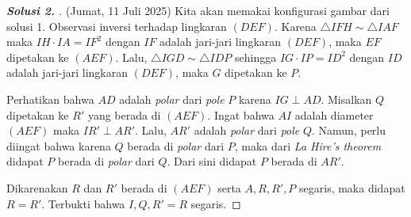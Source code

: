 \begin{proof}[\textbf{Solusi 2. }] (Jumat, 11 Juli 2025) 
    Kita akan memakai konfigurasi gambar dari solusi 1. Observasi inversi terhadap lingkaran $(DEF)$. 
    Karena $\triangle IFH \sim \triangle IAF$ maka $IH \cdot IA = IF^2$ dengan $IF$ adalah jari-jari lingkaran $(DEF)$, maka $EF$ dipetakan ke $(AEF)$.
    Lalu, $\triangle IGD \sim \triangle IDP$ sehingga $IG \cdot IP = ID^2$ dengan $ID$ adalah jari-jari lingkaran $(DEF)$, maka $G$ dipetakan ke $P$.

    Perhatikan bahwa $AD$ adalah \textit{polar} dari \textit{pole} $P$ karena $IG \perp AD$.
    Misalkan $Q$ dipetakan ke $R'$ yang berada di $(AEF)$. Ingat bahwa $AI$ adalah diameter $(AEF)$ maka $IR' \perp AR'$. 
    Lalu, $AR'$ adalah \textit{polar} dari \textit{pole} $Q$. 
    Namun, perlu diingat bahwa karena $Q$ berada di \textit{polar} dari $P$, maka dari \textit{La Hire's theorem} didapat $P$ berada di \textit{polar} dari $Q$. Dari sini didapat $P$ berada di $AR'$.

    Dikarenakan $R$ dan $R'$ berada di $(AEF)$ serta $A,R,R',P$ segaris, maka didapat $R=R'$. Terbukti bahwa $I,Q,R'=R$ segaris.
\end{proof}